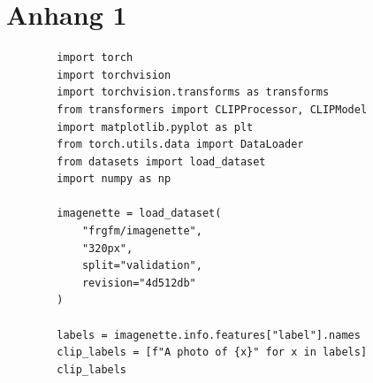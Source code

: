 \documentclass[nolibertine, ngerman, algorithm, nomencl, minted]{ttlab-qualify}
\begin{document}
\chapter{Anhang 1}
	\begin{verbatim}
		import torch
		import torchvision
		import torchvision.transforms as transforms
		from transformers import CLIPProcessor, CLIPModel
		import matplotlib.pyplot as plt
		from torch.utils.data import DataLoader
		from datasets import load_dataset
		import numpy as np
		
		imagenette = load_dataset(
			"frgfm/imagenette",
			"320px",
			split="validation",
			revision="4d512db"
		)
		
		labels = imagenette.info.features["label"].names
		clip_labels = [f"A photo of {x}" for x in labels]
		clip_labels
	\end{verbatim}
\end{document}
